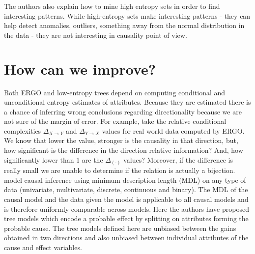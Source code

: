 \documentclass[10pt]{article}
\begin{document}
\par The authors also explain how to mine high entropy sets in order to find interesting patterns. While high-entropy sets make interesting patterns - they can help detect anomalies, outliers, something away from the normal distribution in the data - they are not interesting in causality point of view.  

\section{How can we improve?}
\par Both ERGO and low-entropy trees depend on computing conditional and unconditional entropy estimates of attributes. Because they are estimated there is a chance of inferring wrong conclusions regarding directionality because we are not sure of the margin of error. For example, take the relative conditional complexities $\Delta_{X\rightarrow Y}$ and $\Delta_{Y\rightarrow X}$ values for real world data computed by ERGO. We know that lower the value, stronger is the causality in that direction, but, how significant is the difference in the direction relative information? And, how significantly lower than 1 are the $\Delta_{(\cdot)}$ values? Moreover, if the difference is really small we are unable to determine if the relation is actually a bijection.~\citet{marx2017causal} model causal inference using minimum description length (MDL) on any type of data (univariate, multivariate, discrete, continuous and binary). The MDL of the causal model and the data given the model is applicable to all causal models and is therefore uniformly comparable across models. Here the authors have proposed tree models which encode a probable effect by splitting on attributes forming the probable cause. The tree models defined here are unbiased between the gains obtained in two directions and also unbiased between individual attributes of the cause and effect variables.     


\end{document}
